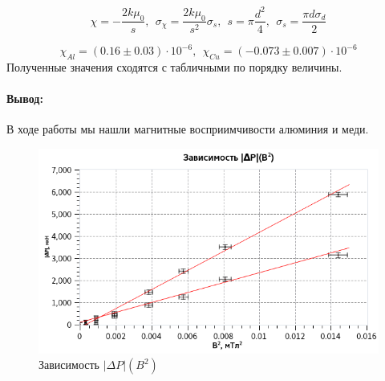 \documentclass{article}
\begin{document}
   \[ \chi =  -\frac{2k\mu_0}{s},~~ \sigma_\chi = \frac{2k\mu_0}{s^2}\sigma_s,~~ s = \pi \frac{d^2}{4},~~ \sigma_s = \frac{\pi d \sigma_d}{2} \]

   \[ \chi_{Al} = (0.16 \pm 0.03) \cdot 10^{-6},~~ \chi_{Cu} = (-0.073 \pm 0.007) \cdot 10^{-6} \]
   Полученные значения сходятся с табличными по порядку величины.
   
   \paragraph*{Вывод:} В ходе работы мы нашли магнитные восприимчивости алюминия и меди.
   \begin{figure}[h]
   \centering
   \includegraphics[width=12cm]{plot2.png} 
   \caption{Зависимость $|\Delta P|(B^2)$} 
   \label{plot.2} 
   \end{figure}
\end{document}
